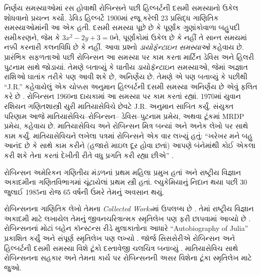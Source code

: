 \documentclass[../../../include/open-logic-section]{subfiles}
\begin{document}
નિર્ણય સમસ્યાઓમાં રસ હોવાથી
રોબિન્સને પછી હિલ્બર્ટની
દસમી સમસ્યાનો ઉકેલ શોધવાનો
પ્રયત્ન કર્યો. ડેવિડ હિલ્બર્ટે
1900માં રજૂ કરેલી 23 પ્રસિદ્ધ
ગાણિતિક સમસ્યાઓમાંની આ
એક હતી. દસમી સમસ્યા પૂછે
છે કે પૂર્ણાંક ગુણાંકોવાળા
બહુપદી સમીકરણને, જેમ કે
$3x^2 - 2y +3 = 0$ને,
પૂર્ણાંકોમાં ઉકેલ છે કે
નહીં તે સાન્ત સમયમાં
નક્કી કરનારી કલનવિધિ
છે કે નહીં. આવા પ્રશ્નો
\emph{ડાયોફૅન્ટાઇન સમસ્યાઓ}
કહેવાય છે. પ્રારંભિક
સફળતાઓ પછી રોબિન્સન
આ સમસ્યા પર કામ કરતા
માર્ટિન ડેવિસ અને
હિલરી પુટનામ સાથે
જોડાયાં. તેમણે બતાવ્યું
કે ઘાતીય ડાયોફૅન્ટાઇન
સમસ્યાઓ, જેમાં અજ્ઞાત
રાશિઓ ઘાતાંક તરીકે પણ
આવી શકે છે, અનિર્ણેય
છે. તેમણે એ પણ
બતાવ્યું કે પછીથી
“J.R.” કહેવાયેલું
એક ચોક્કસ અનુમાન
હિલ્બર્ટની દસમી
સમસ્યા અનિર્ણેય
છે એવું ફલિત કરે
છે \citep{DavisPutnamRobinson1961}.
રોબિન્સન 1960ના
દાયકામાં આ સમસ્યા
પર કામ કરતાં રહ્યાં.
1970માં યુવાન રશિયન
ગણિતશાસ્ત્રી યુરી
માતિયાસેવિચે છેવટે
J.R. અનુમાન સાબિત
કર્યું. સંયુક્ત પરિણામ
આજે માતિયાસેવિચ--રોબિન્સન--
ડેવિસ--પુટનામ પ્રમેય,
અથવા ટૂંકમાં MRDP પ્રમેય,
કહેવાય છે. માતિયાસેવિચ
અને રોબિન્સન મિત્ર
બન્યાં અને અનેક લેખો
પર સાથે કામ કર્યું.
માતિયાસેવિચને લખેલા
પત્રમાં રોબિન્સને
એક વાર લખ્યું હતું:
“ખરેખર મને બહુ આનંદ
છે કે સાથે કામ કરીને
(હજારો માઇલ દૂર
હોવા છતાં) આપણે
બંનેમાંથી કોઈ એકલા
કરી શકે તેના કરતાં
દેખીતી રીતે વધુ
પ્રગતિ કરી રહ્યા છીએ”
\citep[45]{Matijasevich1992}.

રોબિન્સન અમેરિકન
ગણિતીય મંડળનાં
પ્રથમ મહિલા પ્રમુખ
હતાં અને રાષ્ટ્રીય
વિજ્ઞાન અકાદમીના ગણિતવિભાગમાં
ચૂંટાયેલાં પ્રથમ
સ્ત્રી હતાં.
લ્યુકેમિયાનું નિદાન
થયા પછી 30 જુલાઈ
1985ના રોજ 65
વર્ષની ઉંમરે
તેમનું અવસાન થયું.


\begin{reading}
રોબિન્સનના ગાણિતિક
લેખો તેમના
\textit{Collected
  Works}માં ઉપલબ્ધ છે
\citep{Robinson1996}.
તેમાં રાષ્ટ્રીય વિજ્ઞાન
અકાદમી માટે લખાયેલ
તેમનું જીવનચરિત્રાત્મક
સ્મૃતિલેખ પણ ફરી
છાપવામાં આવ્યો છે
\citep{Feferman1994}.
રોબિન્સનનાં મોટાં
બહેન કૉન્સ્ટન્સ રીડે
મુલાકાતોના આધારે
“Autobiography of Julia”
પ્રકાશિત કર્યું
\citep{Reid1986}
અને સંપૂર્ણ
સ્મૃતિલેખ પણ લખ્યો
\citep{Reid1996}.
જૉર્જ સિસસેરીએ
રોબિન્સન અને
હિલ્બર્ટની દસમી
સમસ્યા વિશે ટૂંકો
દસ્તાવેજી ચલચિત્ર
બનાવ્યું
\citep{Csicsery2016}.
માતિયાસેવિચ સાથે
રોબિન્સનના સહકાર
અને તેમના કાર્ય પર
રોબિન્સનની અસર
વિશેના ટૂંકા
સ્મૃતિલેખ માટે
\citep{Matijasevich1992}
જુઓ.
\end{reading}
\end{document}
